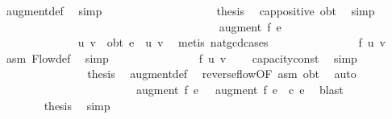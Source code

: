 {\ augment{\isacharunderscore}def\ \isamarkupfalse%
\ simp\isanewline
\ \ \ \ \ \ \ \ \ \ \ \ \ \ \ \ \ \ \isamarkupfalse%
\ {\isacharquery}thesis\ \isamarkupfalse%
\ cap{\isacharunderscore}positive\ obt\ \isamarkupfalse%
\ simp\isanewline
\ \ \ \ \ \ \ \ \ \ \ \ \ \ \isamarkupfalse%
\isanewline
\ \ \ \ \ \ \ \ \ \ \isamarkupfalse%
\isanewline
\ \ \ \ \ \ \ \ \isamarkupfalse%
\ \isamarkupfalse%
\ {\isachardoublequoteopen}{}\ {\isasymle}\ augment\ f{\isacharprime}\ e{\isachardoublequoteclose}\isanewline
\ \ \ \ \ \ \ \ \ \ \isamarkupfalse%
\ {\isacharminus}\isanewline
\ \ \ \ \ \ \ \ \ \ \ \ \isamarkupfalse%
\ u\ v\ \ obt{\isacharcolon}\ {\isachardoublequoteopen}e\ {\isacharequal}\ {\isacharparenleft}u{\isacharcomma}\ v{\isacharparenright}{\isachardoublequoteclose}\ \isamarkupfalse%
\ {\isacharparenleft}metis\ nat{\isacharunderscore}gcd{\isachardot}cases{\isacharparenright}\isanewline
\ \ \ \ \ \ \ \ \ \ \ \ \isamarkupfalse%
\ \isamarkupfalse%
\ {\isachardoublequoteopen}f{\isacharprime}\ {\isacharparenleft}u{\isacharcomma}\ v{\isacharparenright}\ {\isasymge}\ {}{\isachardoublequoteclose}\ \isamarkupfalse%
\ asm\ Flow{\isacharunderscore}def\ \isamarkupfalse%
\ simp\isanewline
\ \ \ \ \ \ \ \ \ \ \ \ \isamarkupfalse%
\ \isamarkupfalse%
\ {\isachardoublequoteopen}f\ {\isacharparenleft}u{\isacharcomma}\ v{\isacharparenright}\ {\isasymge}\ {}{\isachardoublequoteclose}\ \isamarkupfalse%
\ capacity{\isacharunderscore}const\ \isamarkupfalse%
\ simp\isanewline
\ \ \ \ \ \ \ \ \ \ \ \ \isamarkupfalse%
\ \isamarkupfalse%
\ {\isacharquery}thesis\ \isamarkupfalse%
\ augment{\isacharunderscore}def\ \isamarkupfalse%
\ reverse{\isacharunderscore}flow{\isacharbrackleft}OF\ asm{\isacharbrackright}\ obt\ \isamarkupfalse%
\ auto\isanewline
\ \ \ \ \ \ \ \ \ \ \isamarkupfalse%
\isanewline
\ \ \ \ \ \ \ \ \isamarkupfalse%
\ \isamarkupfalse%
\ {\isachardoublequoteopen}{}\ {\isasymle}\ {\isacharparenleft}augment\ f{\isacharprime}{\isacharparenright}\ e\ {\isasymand}\ \ {\isacharparenleft}augment\ f{\isacharprime}{\isacharparenright}\ e\ {\isasymle}\ c\ e{\isachardoublequoteclose}\ \isamarkupfalse%
\ blast\ \ \ \isanewline
\ \ \ \ \ \ \isacommand{{\isacharbraceright}}\isamarkupfalse%
\isanewline
\ \ \ \ \ \ \isamarkupfalse%
\ {\isacharquery}thesis\ \isamarkupfalse%
\ simp\isanewline
\ \ \ \ \isamarkupfalse%
%
\endisatagproof
{\isafoldproof}%
%
\isadelimproof
\ \ \ \ \ \ \ \isanewline
%
\endisadelimproof
{}\isamarkupfalse%
%
}%
